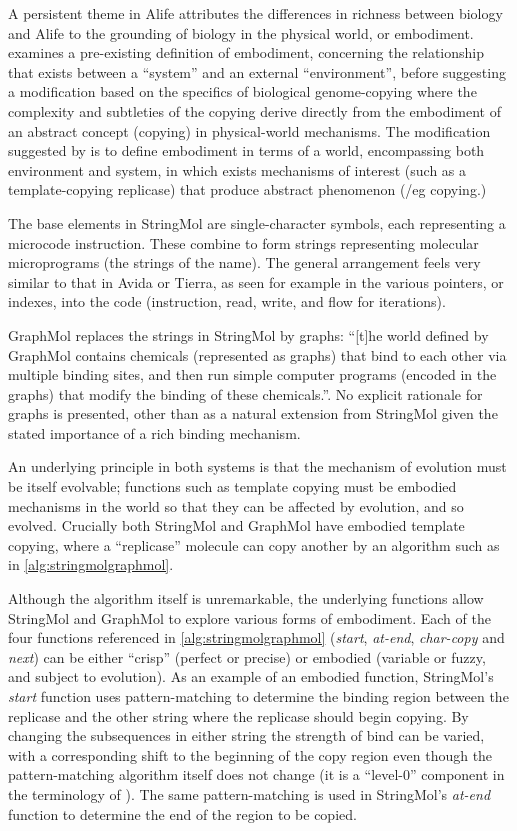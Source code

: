 A persistent theme in Alife attributes the differences in richness between biology and Alife to the grounding of biology in the physical world, or embodiment. \Textcite{Nellis2012} examines a pre-existing definition of embodiment, concerning the relationship that exists between a ``system'' and an external ``environment'', before suggesting a modification based on the specifics of biological genome-copying where the complexity and subtleties of the copying derive directly from the embodiment of an abstract concept (copying) in physical-world mechanisms. The modification suggested by \textcite{Nellis2012} is to define embodiment in terms of a world, encompassing both environment and system, in which exists mechanisms of interest (such as a template-copying replicase) that produce abstract phenomenon (/eg copying.)

The base elements in StringMol are single-character symbols, each representing a microcode instruction. These combine to form strings representing molecular microprograms (the strings of the name). The general arrangement feels very similar to that in Avida or Tierra, as seen for example in the various pointers, or indexes, into the code (instruction, read, write, and flow for iterations).

GraphMol replaces the strings in StringMol by graphs: ``[t]he world defined by GraphMol contains chemicals (represented as graphs) that bind to each other via multiple binding sites, and then run simple computer programs (encoded in the graphs) that modify the binding of these chemicals.''. No explicit rationale for graphs is presented, other than as a natural extension from StringMol given the stated importance of a rich binding mechanism. 

An underlying principle in both systems is that the mechanism of evolution must be itself evolvable; functions such as template copying must be embodied mechanisms in the world so that they can be affected by evolution, and so evolved.  Crucially both StringMol and GraphMol have embodied template copying, where a ``replicase'' molecule can copy another by an algorithm such as in \cref{alg:stringmolgraphmol}.

Although the algorithm itself is unremarkable, the underlying functions allow StringMol and GraphMol to explore various forms of embodiment. Each of the four functions referenced in \cref{alg:stringmolgraphmol} (\emph{start}, \emph{at-end}, \emph{char-copy} and \emph{next}) can be either ``crisp'' (\ie perfect or precise) or embodied (variable or fuzzy, and subject to evolution). As an example of an embodied function, StringMol's \emph{start} function uses pattern-matching to determine the binding region between the replicase and the other string where the replicase should begin copying. By changing the subsequences in either string the strength of bind can be varied, with a corresponding shift to the beginning of the copy region even though the pattern-matching algorithm itself does not change (it is a ``level-0'' component in the terminology of \textcite{BanzhafBaumgaertnerBeslonEtAl2016}). The same pattern-matching is used in StringMol's \emph{at-end} function to determine the end of the region to be copied.

